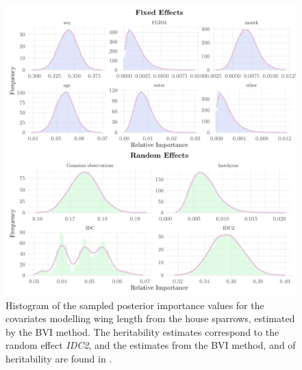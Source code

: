 \begin{figure}[H]
  \centering
  \includegraphics[width=1\linewidth]{Figures/House sparrow study/Wing_ccd.png}
  \caption[Estimated posterior importance of all covariates in the wing length model from the BVI method]{Histogram of the sampled posterior importance values for the covariates modelling wing length from the house sparrows, estimated by the BVI method. The heritability estimates correspond to the random effect \textit{IDC2}, and the estimates from the BVI method, \citet{Silva2017} and \citet{Muff2019Genetic} of heritability are found in .}
  \label{fig:heritability_wing_combined}
\end{figure}
